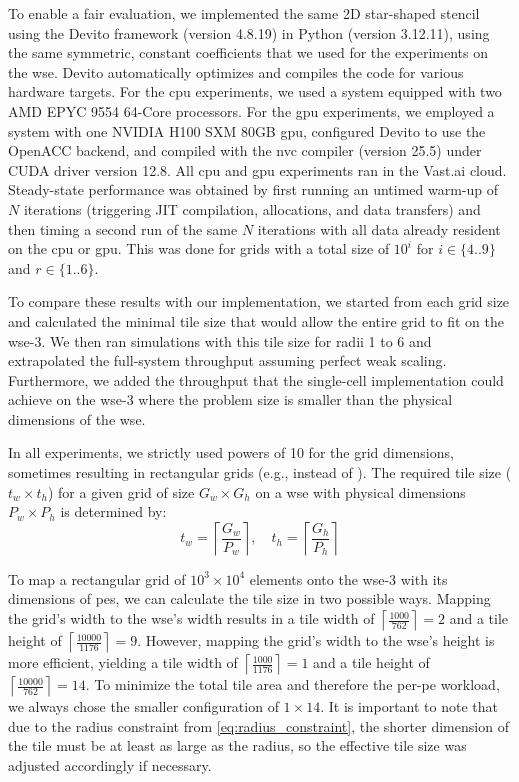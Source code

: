 To enable a fair evaluation, we implemented the same 2D star-shaped stencil using the Devito framework (version 4.8.19) in Python (version 3.12.11), using the same symmetric, constant coefficients that we used for the experiments on the \ac{wse}.
Devito automatically optimizes and compiles the code for various hardware targets.
For the \ac{cpu} experiments, we used a system equipped with two AMD EPYC 9554 64-Core processors. For the \ac{gpu} experiments, we employed a system with one NVIDIA H100 SXM 80GB \ac{gpu}, configured Devito to use the OpenACC backend, and compiled with the nvc compiler (version 25.5) under CUDA driver version 12.8. All \ac{cpu} and \ac{gpu} experiments ran in the Vast.ai cloud.
Steady-state performance was obtained by first running an untimed warm-up of $N$ iterations (triggering JIT compilation, allocations, and data transfers) and then timing a second run of the same $N$ iterations with all data already resident on the \ac{cpu} or \ac{gpu}.
This was done for grids with a total size of $10^i$ for $i \in \{4..9\}$ and $r \in \{1..6\}$.

To compare these results with our implementation, we started from each grid size and calculated the minimal tile size that would allow the entire grid to fit on the \ac{wse}-3.
We then ran simulations with this tile size for radii 1 to 6 and extrapolated the full-system throughput assuming perfect weak scaling. Furthermore, we added the throughput that the single-cell implementation could achieve on the \ac{wse}-3 where the problem size is smaller than the physical dimensions of the \ac{wse}.

In all experiments, we strictly used powers of 10 for the grid dimensions, sometimes resulting in rectangular grids (e.g.,  instead of ). The required tile size ($t_w \times t_h$) for a given grid of size $G_w \times G_h$ on a \ac{wse} with physical dimensions $P_w \times P_h$ is determined by:
\begin{equation}
    t_w = \left\lceil \frac{G_w}{P_w} \right\rceil, \quad t_h = \left\lceil \frac{G_h}{P_h} \right\rceil
\end{equation}

To map a rectangular grid of $10^3\times 10^4$ elements onto the \ac{wse}-3 with its dimensions of  \acp{pe}, we can calculate the tile size in two possible ways. Mapping the grid's width to the \ac{wse}'s width results in a tile width of $\left\lceil \frac{1000}{762} \right\rceil = 2$ and a tile height of $\left\lceil \frac{10000}{1176} \right\rceil = 9$. However, mapping the grid's width to the \ac{wse}'s height is more efficient, yielding a tile width of $\left\lceil \frac{1000}{1176} \right\rceil = 1$ and a tile height of $\left\lceil \frac{10000}{762} \right\rceil = 14$. To minimize the total tile area and therefore the per-\ac{pe} workload, we always chose the smaller configuration of $1 \times 14$. It is important to note that due to the radius constraint from \autoref{eq:radius_constraint}, the shorter dimension of the tile must be at least as large as the radius, so the effective tile size was adjusted accordingly if necessary.

